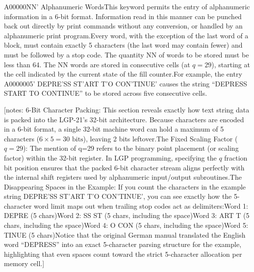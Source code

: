 \documentclass{article}
\begin{document}
\begin{enumerate}
A00000NN' Alphanumeric WordsThis keyword permits the entry of alphanumeric information in a 6-bit format. Information read in this manner can be punched back out directly by print commands without any conversion, or handled by an alphanumeric print program.Every word, with the exception of the last word of a block, must contain exactly 5 characters (the last word may contain fewer) and must be followed by a stop code. The quantity NN of words to be stored must be less than 64. The NN words are stored in consecutive cells (at $q=29$), starting at the cell indicated by the current state of the fill counter.For example, the entry A0000005' DEPRE'SS ST'ART T'O CON'TINUE' causes the string ``DEPRESS START TO CONTINUE'' to be stored across five consecutive cells.

[notes: 6-Bit Character Packing: This section reveals exactly how text string data is packed into the LGP-21's 32-bit architecture. Because characters are encoded in a 6-bit format, a single 32-bit machine word can hold a maximum of 5 characters ($6 \times 5 = 30\text{ bits}$), leaving 2 bits leftover.The Fixed Scaling Factor ($q=29$): The mention of q=29 refers to the binary point placement (or scaling factor) within the 32-bit register. In LGP programming, specifying the $q$ fraction bit position ensures that the packed 6-bit character stream aligns perfectly with the internal shift registers used by alphanumeric input/output subroutines.The Disappearing Spaces in the Example: If you count the characters in the example string DEPRE'SS ST'ART T'O CON'TINUE', you can see exactly how the 5-character word limit maps out when trailing stop codes act as delimiters:Word 1: DEPRE (5 chars)Word 2: SS ST (5 chars, including the space)Word 3: ART T (5 chars, including the space)Word 4: O CON (5 chars, including the space)Word 5: TINUE (5 chars)Notice that the original German manual translated the English word ``DEPRESS'' into an exact 5-character parsing structure for the example, highlighting that even spaces count toward the strict 5-character allocation per memory cell.]


\end{enumerate}
\end{document}
